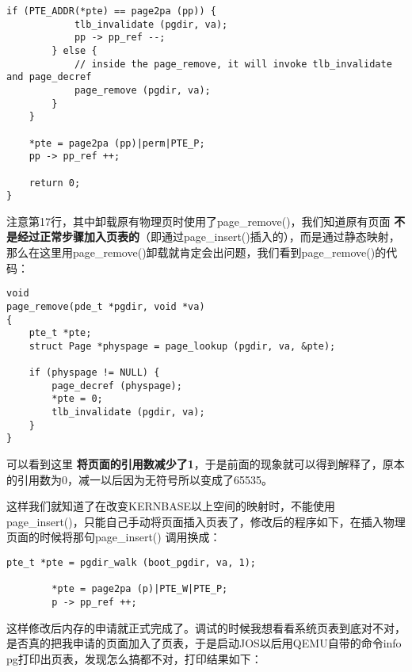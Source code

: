 \documentclass{article}
\newcommand{\highlight}[1]{{\bfseries \color{red}  #1}}
\newcommand{\funcname}[1]{{\ttfamily \small #1}}
\begin{document}
\begin{CJK*}{UTF8}{gkai}
\begin{lstlisting}[style=ccode, title={\scriptsize \ttfamily \bfseries kern/pmap.c: page\_insert()}]
        if (PTE_ADDR(*pte) == page2pa (pp)) {
            tlb_invalidate (pgdir, va);
            pp -> pp_ref --;
        } else {
            // inside the page_remove, it will invoke tlb_invalidate and page_decref
            page_remove (pgdir, va);
        }
    }
    
    *pte = page2pa (pp)|perm|PTE_P;
    pp -> pp_ref ++;

    return 0;
}
\end{lstlisting}

注意第17行，其中卸载原有物理页时使用了\funcname{page\_remove()}，我们知道原有页面\highlight{不是经过正常步骤加入页表的}（即通过\funcname{page\_insert()}插入的），而是通过静态映射，那么在这里用\funcname{page\_remove()}卸载就肯定会出问题，我们看到\funcname{page\_remove()}的代码：

\begin{lstlisting}[style=ccode, title={\scriptsize \ttfamily \bfseries kern/pmap.c: page\_remove()}]
void
page_remove(pde_t *pgdir, void *va)
{
    pte_t *pte;
    struct Page *physpage = page_lookup (pgdir, va, &pte);

    if (physpage != NULL) {
        page_decref (physpage);
        *pte = 0;
        tlb_invalidate (pgdir, va);
    }
}
\end{lstlisting}

可以看到这里\highlight{将页面的引用数减少了1}，于是前面的现象就可以得到解释了，原本的引用数为0，减一以后因为无符号所以变成了65535。

这样我们就知道了在改变KERNBASE以上空间的映射时，不能使用 \funcname{page\_insert()}，只能自己手动将页面插入页表了，修改后的程序如下，在插入物理页面的时候将那句\funcname{page\_insert()} 调用换成：

\begin{lstlisting}[style=ccode]
        pte_t *pte = pgdir_walk (boot_pgdir, va, 1);

        *pte = page2pa (p)|PTE_W|PTE_P;
        p -> pp_ref ++;
\end{lstlisting}

这样修改后内存的申请就正式完成了。调试的时候我想看看系统页表到底对不对，是否真的把我申请的页面加入了页表，于是启动JOS以后用QEMU自带的命令info pg打印出页表，发现怎么搞都不对，打印结果如下：


\end{CJK*}
\end{document}
